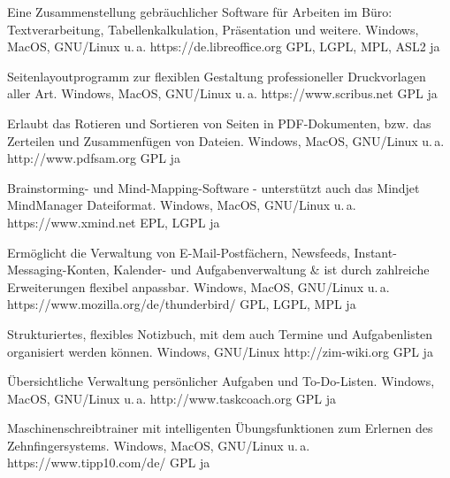 





{Eine Zusammenstellung gebräuchlicher Software für Arbeiten im Büro: Textverarbeitung, Tabellenkalkulation, Präsentation und weitere.}
{Windows, MacOS, GNU/Linux u.\,a.}
{https://de.libreoffice.org} 
{GPL, LGPL, MPL, ASL2}
{ja}

{Seitenlayoutprogramm zur flexiblen Gestaltung professioneller Druckvorlagen aller Art.}
{Windows, MacOS, GNU/Linux u.\,a.}
{https://www.scribus.net}
{GPL}
{ja}

{Erlaubt das Rotieren und Sortieren von Seiten in PDF-Dokumenten, bzw. das Zerteilen und Zusammenfügen von Dateien.}
{Windows, MacOS, GNU/Linux u.\,a.}
{http://www.pdfsam.org}
{GPL}
{ja}

{Brainstorming- und Mind-Mapping-Software - unterstützt auch das Mindjet MindManager Dateiformat.}
{Windows, MacOS, GNU/Linux u.\,a.}
{https://www.xmind.net}
{EPL, LGPL}
{ja}

{Ermöglicht die Verwaltung von E-Mail-Postfächern, Newsfeeds, Instant-Messaging-Konten, Kalender- und Aufgabenverwaltung \& ist durch zahlreiche Erweiterungen flexibel anpassbar.}
{Windows, MacOS, GNU/Linux u.\,a.}
{https://www.mozilla.org/de/thunderbird/}
{GPL, LGPL, MPL}
{ja}

{Strukturiertes, flexibles Notizbuch, mit dem auch Termine und Aufgabenlisten organisiert werden können.}
{Windows, GNU/Linux}
{http://zim-wiki.org}
{GPL}
{ja}

{Übersichtliche Verwaltung persönlicher Aufgaben und To-Do-Listen.}
{Windows, MacOS, GNU/Linux u.\,a.}
{http://www.taskcoach.org}
{GPL}
{ja}


{Maschinenschreibtrainer mit intelligenten Übungsfunktionen zum Erlernen des Zehnfingersystems.}
{Windows, MacOS, GNU/Linux u.\,a.}
{https://www.tipp10.com/de/}
{GPL}
{ja}

\backpage



